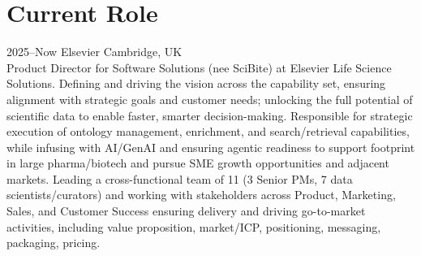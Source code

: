 \section{Current Role}
\begin{entrylist}
\entry
  {2025--Now}
  {Elsevier}
  {Cambridge, UK}
  {\\
  Product Director for Software Solutions (nee SciBite) at Elsevier Life Science Solutions. Defining and driving the vision across the capability set, ensuring alignment with strategic goals and customer needs; unlocking the full potential of scientific data to enable faster, smarter decision-making. Responsible for strategic execution of ontology management, enrichment, and search/retrieval capabilities, while infusing with AI/GenAI and ensuring agentic readiness to support footprint in large pharma/biotech and pursue SME growth opportunities and adjacent markets. Leading a cross-functional team of 11 (3 Senior PMs, 7 data scientists/curators) and working with stakeholders across Product, Marketing, Sales, and Customer Success ensuring delivery and driving go-to-market activities, including value proposition, market/ICP, positioning, messaging, packaging, pricing.
  }
\end{entrylist}